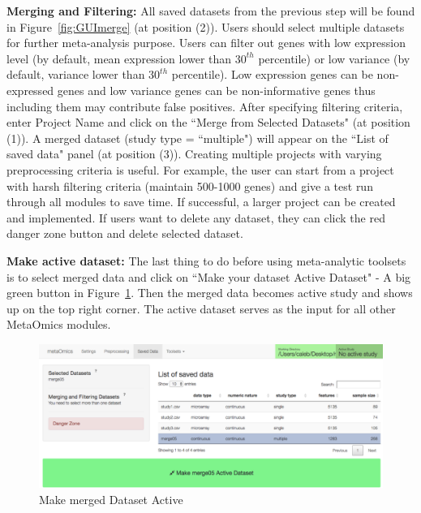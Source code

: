 \begin{steps}
\item \textbf{Merging and Filtering:}
All saved datasets from the previous step will be found in  Figure~\ref{fig:GUImerge} (at position {\color{red} (2)}).
Users should select multiple datasets for further meta-analysis purpose.
Users can filter out genes with low expression level (by default, mean expression lower than $30^{th}$ percentile)
or low variance (by default, variance lower than $30^{th}$ percentile).
Low expression genes can be non-expressed genes and low variance genes can be non-informative genes thus including them may contribute false positives.
After specifying filtering criteria, enter Project Name and click on the ``Merge from Selected Datasets" (at position {\color{red} (1)}).
A merged dataset (study type = ``multiple") will appear on the  ``List of saved data" panel (at position {\color{red} (3)}).
Creating multiple projects with varying preprocessing criteria is useful.
For example, the user can start from a project with harsh filtering criteria (maintain 500-1000 genes) and give a test run through all modules to save time.
If successful, a larger project can be created and implemented.
If users want to delete any dataset, they can click the red danger zone button and delete selected dataset.

\item \textbf{Make active dataset:}
\label{sec:active}
The last thing to do before using meta-analytic toolsets is to select merged data and click on 
``Make your dataset Active Dataset" - A big green button in Figure~\ref{fig:active}.
Then the merged data becomes active study and shows up on the top right corner.
The active dataset serves as the input for all other MetaOmics modules.


\end{steps}







\begin{figure}[H]
\begin{center}
\includegraphics[scale=0.7]{./figure/preprocessing/GUImarkActive}
\caption{Make merged Dataset Active}
\label{fig:active}
\end{center}
\end{figure}




